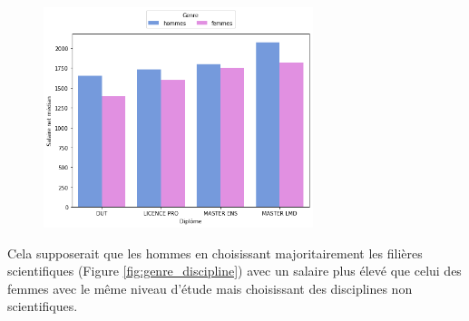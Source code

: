 \documentclass[12pt, a4paper, titlepage, table]{article}
\begin{document}
	\begin{figure}[H]
		\centering
		\includegraphics[width=0.7\textwidth]{../graphs/salaires_medians_genre.png}
		\label{fig:salaire_median_genre}
	\end{figure}
	Cela supposerait que les hommes en choisissant majoritairement les filières scientifiques (Figure \ref{fig:genre_discipline}) avec un salaire plus élevé que celui des femmes avec le même niveau d'étude mais choisissant des disciplines non scientifiques.
	
\end{document}
